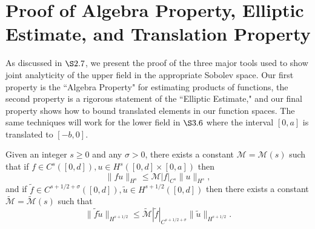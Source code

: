 \chapter{Proof of Algebra Property, Elliptic Estimate, and Translation Property}
\label{Appendix B: Alebra and Elliptic Property}
\thispagestyle{pageonbottom}

\pagestyle{fancy}
\renewcommand{\sectionmark}[1]{\markright{#1}}
\fancyhead{}
\fancyhead[LE,RO]{\thepage}
\fancyfoot[L,R,C]{}
\renewcommand{\headrulewidth}{1pt}%

As discussed in $\S 2.7$, we present the proof of the three major tools used to show joint analyticity of the upper field in the appropriate Sobolev space. Our first property is the ``Algebra Property" for estimating products of functions, the second property is a rigorous statement of the ``Elliptic Estimate," and our final property shows how to bound translated elements in our function spaces. The same techniques will work for the lower field in $\S3.6$ where the interval $[0,a]$ is translated to $[-b,0]$.
\begin{lemma} Given an integer $s \ge 0$ and any $\sigma > 0$, there exists a constant $\mathcal{M}=\mathcal{M}(s)$ such that if $f\in C^s([0,d]),u\in H^s([0,d]\times [0,a])$ then
\begin{equation}
\|fu\|_{H^s} \le \mathcal{M}|f|_{C^s}\|u\|_{H^s},
\end{equation}
and if $\tilde{f}\in C^{s+1/2+\sigma}([0,d]),\tilde{u}\in H^{s+1/2}([0,d])$ then there exists a constant $\tilde{\mathcal{M}}=\tilde{\mathcal{M}}(s)$ such that
\begin{equation}
 \|\tilde{f}\tilde{u}\|_{H^{s+1/2}} \le \tilde{\mathcal{M}}|\tilde{f}|_{C^{s+1/2+\sigma}}\|\tilde{u}\|_{H^{s+1/2}}.   
\end{equation}
\end{lemma}
\vspace{1 mm}
